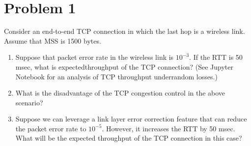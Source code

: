\section*{Problem 1}

Consider an end-to-end TCP connection in which the last hop is a wireless link.
Assume that MSS is 1500 bytes.
\begin{enumerate}
    \item  Suppose that packet error rate in the wireless link is $10^{-3}$.
          If the RTT is 50 msec, what is expectedthroughput of the TCP connection?
          (See Jupyter Notebook for an analysis of TCP throughput underrandom losses.)
    \item  What is the disadvantage of the TCP congestion control in the above scenario?
    \item  Suppose we can leverage a link layer error correction feature that can reduce the packet error rate to $10^{-5}$.
          However, it increases the RTT by 50 msec.
          What will be the expected throughput of the TCP connection in this case?
\end{enumerate}
